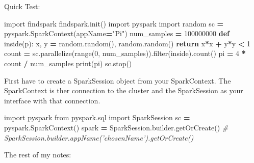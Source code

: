 \documentclass[]{book}
\newenvironment{Shaded}{\begin{snugshade}}{\end{snugshade}}
\newcommand{\KeywordTok}[1]{\textcolor[rgb]{0.13,0.29,0.53}{\textbf{#1}}}
\newcommand{\DecValTok}[1]{\textcolor[rgb]{0.00,0.00,0.81}{#1}}
\newcommand{\StringTok}[1]{\textcolor[rgb]{0.31,0.60,0.02}{#1}}
\newcommand{\ImportTok}[1]{#1}
\newcommand{\CommentTok}[1]{\textcolor[rgb]{0.56,0.35,0.01}{\textit{#1}}}
\newcommand{\ControlFlowTok}[1]{\textcolor[rgb]{0.13,0.29,0.53}{\textbf{#1}}}
\newcommand{\OperatorTok}[1]{\textcolor[rgb]{0.81,0.36,0.00}{\textbf{#1}}}
\newcommand{\BuiltInTok}[1]{#1}
\newcommand{\NormalTok}[1]{#1}
\theoremstyle{definition}
\theoremstyle{definition}
\theoremstyle{definition}
\theoremstyle{remark}
\begin{document}
Quick Test:

\begin{Shaded}
\begin{Highlighting}[]
\ImportTok{import}\NormalTok{ findspark}
\NormalTok{findspark.init()}
\ImportTok{import}\NormalTok{ pyspark}
\ImportTok{import}\NormalTok{ random}
\NormalTok{sc }\OperatorTok{=}\NormalTok{ pyspark.SparkContext(appName}\OperatorTok{=}\StringTok{"Pi"}\NormalTok{)}
\NormalTok{num_samples }\OperatorTok{=} \DecValTok{100000000}
\KeywordTok{def}\NormalTok{ inside(p):     }
\NormalTok{    x, y }\OperatorTok{=}\NormalTok{ random.random(), random.random()}
    \ControlFlowTok{return}\NormalTok{ x}\OperatorTok{*}\NormalTok{x }\OperatorTok{+}\NormalTok{ y}\OperatorTok{*}\NormalTok{y }\OperatorTok{<} \DecValTok{1}
\NormalTok{count }\OperatorTok{=}\NormalTok{ sc.parallelize(}\BuiltInTok{range}\NormalTok{(}\DecValTok{0}\NormalTok{, num_samples)).}\BuiltInTok{filter}\NormalTok{(inside).count()}
\NormalTok{pi }\OperatorTok{=} \DecValTok{4} \OperatorTok{*}\NormalTok{ count }\OperatorTok{/}\NormalTok{ num_samples}
\BuiltInTok{print}\NormalTok{(pi)}
\NormalTok{sc.stop()}
\end{Highlighting}
\end{Shaded}

First have to create a SparkSession object from your SparkContext. The
SparkContext is ther connection to the cluster and the SparkSession as
your interface with that connection.

\begin{Shaded}
\begin{Highlighting}[]
\ImportTok{import}\NormalTok{ pyspark}
\ImportTok{from}\NormalTok{ pyspark.sql }\ImportTok{import}\NormalTok{ SparkSession}
\NormalTok{sc }\OperatorTok{=}\NormalTok{ pyspark.SparkContext()}
\NormalTok{spark }\OperatorTok{=}\NormalTok{ SparkSession.builder.getOrCreate() }\CommentTok{# SparkSession.builder.appName('chosenName').getOrCreate()}
\end{Highlighting}
\end{Shaded}

The rest of my notes:
\end{document}
